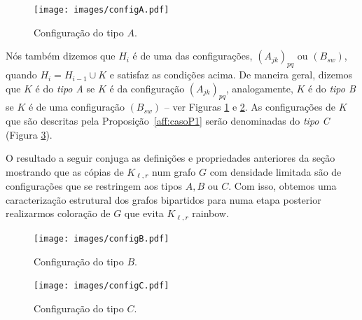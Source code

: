 \documentclass[12pt,a4paper]{book}
\newcommand{\K}{K_{\ell,r}} %
\begin{document}
  \begin{figure}[htb] \centering \texttt{[image: images/configA.pdf]}
   \caption{Configuração do tipo $A$.}
   \label{fig:configA}
 \end{figure}

    Nós também dizemos que $H_i$ é de uma das configurações, $(A_{jk})_{pq}$ ou $(B_{sw})$, 
    quando $H_i = H_{i-1} \cup K$ e satisfaz as condições acima. 
	De maneira geral, dizemos que $K$ é do \textit{tipo A} se $K$ é da configuração $(A_{jk})_{pq}$, analogamente,
		$K$ é do \textit{tipo B} se $K$ é de uma configuração $(B_{sw})$ -- ver Figuras \ref{fig:configA} e \ref{fig:configB}.
    As configurações de $K$ que são descritas pela Proposição~\ref{aff:casoP1} serão denominadas do \textit{tipo C} (Figura \ref{fig:configC}).
    
    O resultado a seguir conjuga as definições e propriedades anteriores da seção mostrando que as cópias de $\K$ num grafo $G$ com densidade limitada são de configurações que se restringem aos tipos $A, B$ ou $C$. 
    Com isso, obtemos uma caracterização estrutural dos grafos bipartidos para numa etapa posterior realizarmos coloração de $G$ que evita $\K$ rainbow.
  

  
 \begin{figure}[htb] \centering \texttt{[image: images/configB.pdf]}
   \caption{Configuração do tipo $B$.}
   \label{fig:configB}
 \end{figure}

   \begin{figure}[htb] \centering \texttt{[image: images/configC.pdf]}
   \caption{Configuração do tipo $C$.}
   \label{fig:configC}
 \end{figure}
\end{document}
